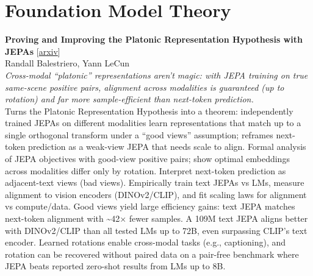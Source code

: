 \documentclass[12pt,letterpaper]{article}
\begin{document}
\medskip


\section*{Foundation Model Theory}

{\small\textbf{Proving and Improving the Platonic Representation Hypothesis with JEPAs}} {\scriptsize[\href{https://arxiv.org/abs/2610.39302}{arxiv}]}\\
{\scriptsize Randall Balestriero, Yann LeCun}\\

{\small\textit{Cross-modal ``platonic'' representations aren't magic: with JEPA training on true same-scene positive pairs, alignment across modalities is guaranteed (up to rotation) and far more sample-efficient than next-token prediction.}}\\[1pt]
{\footnotesize Turns the Platonic Representation Hypothesis into a theorem: independently trained JEPAs on different modalities learn representations that match up to a single orthogonal transform under a ``good views'' assumption; reframes next-token prediction as a weak-view JEPA that needs scale to align. Formal analysis of JEPA objectives with good-view positive pairs; show optimal embeddings across modalities differ only by rotation. Interpret next-token prediction as adjacent-text views (bad views). Empirically train text JEPAs vs LMs, measure alignment to vision encoders (DINOv2/CLIP), and fit scaling laws for alignment vs compute/data. Good views yield large efficiency gains: text JEPA matches next-token alignment with \textasciitilde{}42× fewer samples. A 109M text JEPA aligns better with DINOv2/CLIP than all tested LMs up to 72B, even surpassing CLIP's text encoder. Learned rotations enable cross-modal tasks (e.g., captioning), and rotation can be recovered without paired data on a pair-free benchmark where JEPA beats reported zero-shot results from LMs up to 8B.}

\medskip
\end{document}
